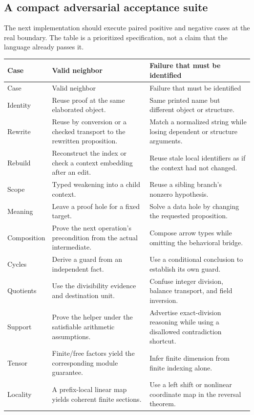 \documentclass[11pt,letterpaper]{article}
\theoremstyle{definition}\newtheorem{definition}[proposition]{Definition}
\theoremstyle{remark}\newtheorem{remark}[proposition]{Remark}
\begin{document}
\subsection{A compact adversarial acceptance suite}\label{sec:negatives}
The next implementation should execute paired positive and negative cases at
the real boundary. The table is a prioritized specification, not a claim that
the language already passes it.
\begin{center}\small
\begin{longtable}{@{}P{0.12\textwidth}P{0.38\textwidth}P{0.40\textwidth}@{}}
\toprule Case & Valid neighbor & Failure that must be identified\\\midrule\endfirsthead
\toprule Case & Valid neighbor & Failure that must be identified\\\midrule\endhead
\bottomrule\endfoot
Identity & Reuse proof at the same elaborated object. & Same printed name but different object or structure.\\
Rewrite & Reuse by conversion or a checked transport to the rewritten proposition. & Match a normalized string while losing dependent or structure arguments.\\
Rebuild & Reconstruct the index or check a context embedding after an edit. & Reuse stale local identifiers as if the context had not changed.\\
Scope & Typed weakening into a child context. & Reuse a sibling branch's nonzero hypothesis.\\
Meaning & Leave a proof hole for a fixed target. & Solve a data hole by changing the requested proposition.\\
Composition & Prove the next operation's precondition from the actual intermediate. & Compose arrow types while omitting the behavioral bridge.\\
Cycles & Derive a guard from an independent fact. & Use a conditional conclusion to establish its own guard.\\
Quotients & Use the divisibility evidence and destination unit. & Confuse integer division, balance transport, and field inversion.\\
Support & Prove the helper under the satisfiable arithmetic assumptions. & Advertise exact-division reasoning while using a disallowed contradiction shortcut.\\
Tensor & Finite/free factors yield the corresponding module guarantee. & Infer finite dimension from finite indexing alone.\\
Locality & A prefix-local linear map yields coherent finite sections. & Use a left shift or nonlinear coordinate map in the reversal theorem.\\

\end{longtable}
\end{center}
\end{document}
